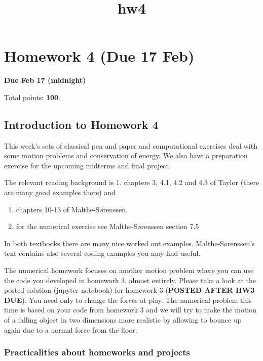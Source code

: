 \documentclass[11pt]{article}
\title{hw4}
\begin{document}
    
    \maketitle
    
    

    
    

    \section{Homework 4 (Due 17 Feb)}\label{homework-4-due-17-feb}

\textbf{Due Feb 17 (midnight)}

Total points: \textbf{100}.

    \subsection{Introduction to Homework
4}\label{introduction-to-homework-4}

This week's sets of classical pen and paper and computational exercises
deal with some motion problems and conservation of energy. We also have
a preparation exercise for the upcoming midterms and final project.

The relevant reading background is 1. chapters 3, 4.1, 4.2 and 4.3 of
Taylor (there are many good examples there) and

\begin{enumerate}
\def\labelenumi{\arabic{enumi}.}
\setcounter{enumi}{1}
\item
  chapters 10-13 of Malthe-Sørenssen.
\item
  for the numerical exercise see Malthe-Sørenssen section 7.5
\end{enumerate}

In both textbooks there are many nice worked out examples.
Malthe-Sørenssen's text contains also several coding examples you may
find useful.

The numerical homework focuses on another motion problem where you can
use the code you developed in homework 3, almost entirely. Please take a
look at the posted solution (jupyter-notebook) for homework 3
(\textbf{POSTED AFTER HW3 DUE}). You need only to change the forces at
play. The numerical problem this time is based on your code from
homework 3 and we will try to make the motion of a falling object in two
dimensions more realistic by allowing to bounce up again due to a normal
force from the floor.

\subsubsection{Practicalities about homeworks and
projects}\label{practicalities-about-homeworks-and-projects}
\end{document}
